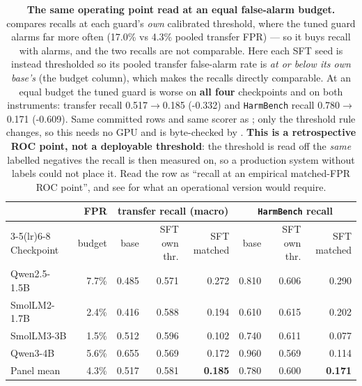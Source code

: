 \begin{table}[htbp]\centering\small\setlength{\tabcolsep}{4.5pt}
\caption{\textbf{The same operating point read at an equal false-alarm budget.}  compares recalls at each guard's \emph{own} calibrated threshold, where the tuned guard alarms far more often (17.0\% vs 4.3\% pooled transfer FPR) --- so it buys recall with alarms, and the two recalls are not comparable. Here each SFT seed is instead thresholded so its pooled transfer false-alarm rate is \emph{at or below its own base's} (the budget column), which makes the recalls directly comparable. At an equal budget the tuned guard is worse on \textbf{all four} checkpoints and on both instruments: transfer recall 0.517$\rightarrow$0.185 (-0.332) and \texttt{HarmBench} recall 0.780$\rightarrow$0.171 (-0.609). Same committed rows and same scorer as ; only the threshold rule changes, so this needs no GPU and is byte-checked by . \textbf{This is a retrospective ROC point, not a deployable threshold}: the threshold is read off the \emph{same} labelled negatives the recall is then measured on, so a production system without labels could not place it. Read the row as ``recall at an empirical matched-FPR ROC point'', and see  for what an operational version would require.}
\label{tab:matchedfpr}
\begin{tabular}{lrrrrrrr}\toprule
& FPR & \multicolumn{3}{c}{transfer recall (macro)} & \multicolumn{3}{c}{\texttt{HarmBench} recall} \\
\cmidrule(lr){3-5}\cmidrule(lr){6-8}
Checkpoint & budget & base & SFT own thr. & SFT matched & base & SFT own thr. & SFT matched \\
\midrule
Qwen2.5-1.5B & 7.7\% & 0.485 & 0.571 & 0.272 & 0.810 & 0.606 & 0.290 \\
SmolLM2-1.7B & 2.4\% & 0.416 & 0.588 & 0.194 & 0.610 & 0.615 & 0.202 \\
SmolLM3-3B & 1.5\% & 0.512 & 0.596 & 0.102 & 0.740 & 0.611 & 0.077 \\
Qwen3-4B & 5.6\% & 0.655 & 0.569 & 0.172 & 0.960 & 0.569 & 0.114 \\
\midrule
Panel mean & 4.3\% & 0.517 & 0.581 & \textbf{0.185} & 0.780 & 0.600 & \textbf{0.171} \\
\bottomrule
\end{tabular}
\end{table}
